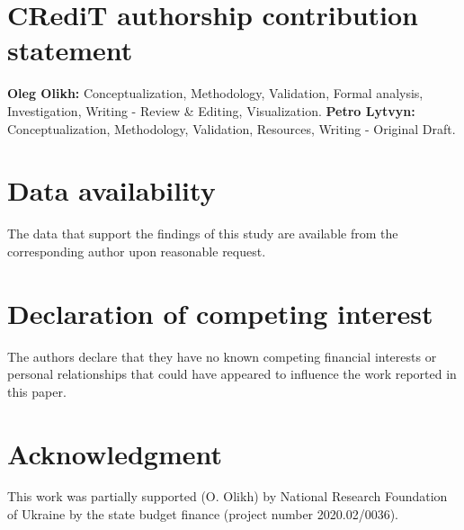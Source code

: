 \documentclass[final,3p,times,twocolumn,authoryear]{elsarticle}
\begin{document}



\section*{CRediT authorship contribution statement}
\textbf{Oleg Olikh:} Conceptualization, Methodology, Validation, Formal analysis, Investigation, Writing - Review \& Editing, Visualization.
\textbf{Petro Lytvyn:} Conceptualization, Methodology, Validation, Resources, Writing - Original Draft.


\section*{Data availability}

The data that support the findings of this study are available from the corresponding author upon reasonable request.

\section*{Declaration of competing interest}

The authors declare that they have no known competing financial interests or personal relationships that could have appeared to influence the work reported in this paper.


\section*{Acknowledgment}

This work was partially supported (O. Olikh) by National Research Foundation of Ukraine
by the state budget finance (project number 2020.02/0036).


%
%
%



\end{document}
